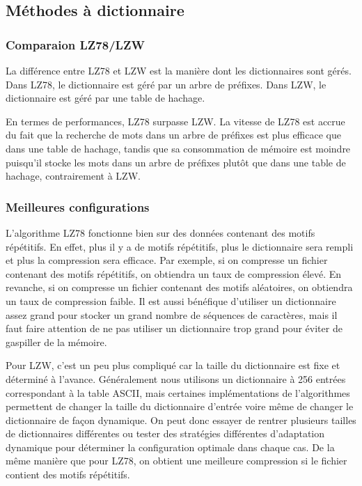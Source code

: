 \subsection{Méthodes à dictionnaire}

    \subsubsection{Comparaion LZ78/LZW}

    La différence entre LZ78 et LZW est la manière dont les dictionnaires sont gérés. Dans LZ78, le dictionnaire est géré par un arbre de préfixes. Dans LZW, le dictionnaire est géré par une table de hachage.

    \medskip

    En termes de performances, LZ78 surpasse LZW. La vitesse de LZ78 est accrue du fait que la recherche de mots dans un arbre de préfixes est plus efficace que dans une table de hachage, tandis que sa consommation de mémoire est moindre puisqu'il stocke les mots dans un arbre de préfixes plutôt que dans une table de hachage, contrairement à LZW.

    \subsubsection{Meilleures configurations}

    L'algorithme LZ78 fonctionne bien sur des données contenant des motifs répétitifs. En effet, plus il y a de motifs répétitifs, plus le dictionnaire sera rempli et plus la compression sera efficace. Par exemple, si on compresse un fichier contenant des motifs répétitifs, on obtiendra un taux de compression élevé. En revanche, si on compresse un fichier contenant des motifs aléatoires, on obtiendra un taux de compression faible. Il est aussi bénéfique d'utiliser un dictionnaire assez grand pour stocker un grand nombre de séquences de caractères, mais il faut faire attention de ne pas utiliser un dictionnaire trop grand pour éviter de gaspiller de la mémoire.

    Pour LZW, c'est un peu plus compliqué car la taille du dictionnaire est fixe et déterminé à l'avance. Généralement nous utilisons un dictionnaire à 256 entrées correspondant à la table ASCII, mais certaines implémentations de l'algorithmes permettent de changer la taille du dictionnaire d'entrée voire même de changer le dictionnaire de façon dynamique. On peut donc essayer de rentrer plusieurs tailles de dictionnaires différentes ou tester des stratégies différentes d'adaptation dynamique pour déterminer la configuration optimale dans chaque cas. De la même manière que pour LZ78, on obtient une meilleure compression si le fichier contient des motifs répétitifs.